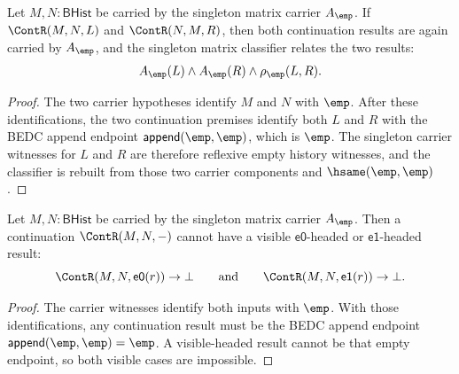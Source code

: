 \begin{theorem}
\label{thm:matrix-singleton-classifier-continuation-comm-closed}
Let $M,N:\mathsf{BHist}$ be carried by the singleton matrix carrier
$A_{\emp}$. If $\ContR(M,N,L)$ and $\ContR(N,M,R)$, then both continuation
results are again carried by $A_{\emp}$, and the singleton matrix classifier
relates the two results:
$$
A_{\emp}(L)\land A_{\emp}(R)\land \rho_{\emp}(L,R).
$$
\end{theorem}
\begin{proof}
The two carrier hypotheses identify $M$ and $N$ with $\emp$. After these
identifications, the two continuation premises identify both $L$ and $R$ with
the BEDC append endpoint $\mathsf{append}(\emp,\emp)$, which is $\emp$. The
singleton carrier witnesses for $L$ and $R$ are therefore reflexive empty
history witnesses, and the classifier is rebuilt from those two carrier
components and $\hsame(\emp,\emp)$.
\end{proof}

\begin{theorem}
\label{thm:matrix-singleton-carrier-continuation-visible-result-absurd}
Let $M,N:\mathsf{BHist}$ be carried by the singleton matrix carrier
$A_{\emp}$. Then a continuation \(\ContR(M,N,-)\) cannot have a visible
\(\mathsf{e0}\)-headed or \(\mathsf{e1}\)-headed result:
$$
\ContR(M,N,\mathsf{e0}(r))\to\bot
\qquad\text{and}\qquad
\ContR(M,N,\mathsf{e1}(r))\to\bot.
$$
\end{theorem}
\begin{proof}
The carrier witnesses identify both inputs with \(\emp\). With those
identifications, any continuation result must be the BEDC append endpoint
\(\mathsf{append}(\emp,\emp)=\emp\). A visible-headed result cannot be that
empty endpoint, so both visible cases are impossible.
\end{proof}
